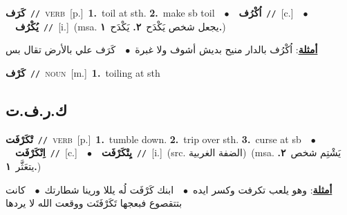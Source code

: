 \documentclass[10pt,a4paper,twoside]{article} %
\begin{document}
\begin{multicols}{2}
{\setlength\topsep{0pt}\textbf{\foreignlanguage{arabic}{كَرَف}}\ {\color{gray}\texttt{//}\color{black}}\ \textsc{verb}\ [p.]\ \textbf{1.}~toil at sth.  \textbf{2.}~make sb toil\ \ $\bullet$\ \ \setlength\topsep{0pt}\textbf{\foreignlanguage{arabic}{اُكْرُف}}\ {\color{gray}\texttt{//}\color{black}}\ [c.]\ \ $\bullet$\ \ \setlength\topsep{0pt}\textbf{\foreignlanguage{arabic}{يُكْرُف}}\ {\color{gray}\texttt{//}\color{black}}\ [i.]\ \color{gray}(msa. \foreignlanguage{arabic}{يجعل شخص يَكْدَح}~\foreignlanguage{arabic}{\textbf{٢.}}  \foreignlanguage{arabic}{يَكْدَح}~\foreignlanguage{arabic}{\textbf{١.}})\color{black}\  \begin{flushright}\color{gray}\foreignlanguage{arabic}{\textbf{\underline{\foreignlanguage{arabic}{أمثلة}}}: اُكْرُف بالدار منيح بديش أشوف ولا غبرة\ $\bullet$\ \  كَرَف علي بالأرض تقال بس}\end{flushright}\color{black}} \vspace{2mm}

{\setlength\topsep{0pt}\textbf{\foreignlanguage{arabic}{كَرْف}}\ {\color{gray}\texttt{//}\color{black}}\ \textsc{noun}\ [m.]\ \textbf{1.}~toiling at sth\ } \vspace{2mm}

\vspace{-3mm}
\subsection*{\color{blue}\foreignlanguage{arabic}{ك.ر.ف.ت}\color{blue}{}} 

{\setlength\topsep{0pt}\textbf{\foreignlanguage{arabic}{تْكَرْفَت}}\ {\color{gray}\texttt{//}\color{black}}\ \textsc{verb}\ [p.]\ \textbf{1.}~tumble down.  \textbf{2.}~trip over sth.  \textbf{3.}~curse at sb\ \ $\bullet$\ \ \setlength\topsep{0pt}\textbf{\foreignlanguage{arabic}{اِتْكَرْفَت}}\ {\color{gray}\texttt{//}\color{black}}\ [c.]\ \ $\bullet$\ \ \setlength\topsep{0pt}\textbf{\foreignlanguage{arabic}{يِتْكَرْفَت}}\ {\color{gray}\texttt{//}\color{black}}\ [i.]\ (src. \color{gray}\foreignlanguage{arabic}{الضفة الغربية}\color{black})\ \color{gray}(msa. \foreignlanguage{arabic}{يَشْتِم شخص}~\foreignlanguage{arabic}{\textbf{٢.}}  \foreignlanguage{arabic}{يتعَثَّر}~\foreignlanguage{arabic}{\textbf{١.}})\color{black}\  \begin{flushright}\color{gray}\foreignlanguage{arabic}{\textbf{\underline{\foreignlanguage{arabic}{أمثلة}}}: وهو يلعب تكرفت وكسر ايده\ $\bullet$\ \  ابنك كَرْفَت لُه يللا ورينا شطارتك\ $\bullet$\ \  كانت بتتقصوع فبعجها تَكَرْفَتَت ووقعت الله لا يردها}\end{flushright}\color{black}} \vspace{2mm}


\end{multicols}
\end{document}
